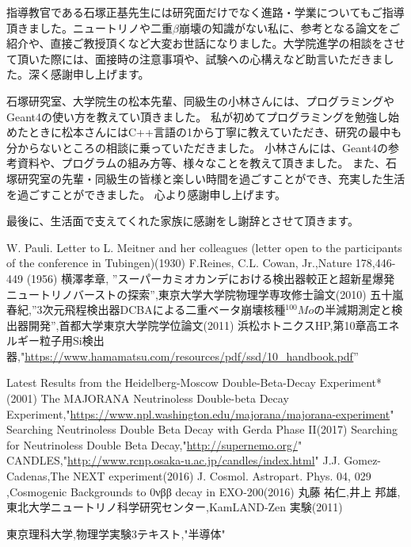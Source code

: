 \documentclass[a4paper,10pt]{jreport}
\begin{document}
指導教官である石塚正基先生には研究面だけでなく進路・学業についてもご指導頂きました。ニュートリノや二重$\beta$崩壊の知識がない私に、参考となる論文をご紹介や、直接ご教授頂くなど大変お世話になりました。大学院進学の相談をさせて頂いた際には、面接時の注意事項や、試験への心構えなど助言いただきました。深く感謝申し上げます。

石塚研究室、大学院生の松本先輩、同級生の小林さんには、プログラミングやGeant4の使い方を教えてい頂きました。
私が初めてプログラミングを勉強し始めたときに松本さんにはC++言語の1から丁寧に教えていただき、研究の最中も分からないところの相談に乗っていただきました。
小林さんには、Geant4の参考資料や、プログラムの組み方等、様々なことを教えて頂きました。
また、石塚研究室の先輩・同級生の皆様と楽しい時間を過ごすことができ、充実した生活を過ごすことができました。
心より感謝申し上げます。

最後に、生活面で支えてくれた家族に感謝をし謝辞とさせて頂きます。




\begin{thebibliography}{9}
 W. Pauli. Letter to L. Meitner and her colleagues (letter open to the participants of the conference in Tubingen)(1930)
 F.Reines, C.L. Cowan, Jr.,Nature 178,446-449 (1956)
 横澤孝章, ''スーパーカミオカンデにおける検出器較正と超新星爆発ニュートリノバーストの探索'',東京大学大学院物理学専攻修士論文(2010)
五十嵐春紀,''3次元飛程検出器DCBAによる二重ベータ崩壊核種$^{100}Mo$の半減期測定と検出器開発'',首都大学東京大学院学位論文(2011)
浜松ホトニクスHP,第10章高エネルギー粒子用Si検出器,"\url{https://www.hamamatsu.com/resources/pdf/ssd/10_handbook.pdf}''

Latest Results from the Heidelberg-Moscow Double-Beta-Decay Experiment*(2001)
The MAJORANA Neutrinoless Double-beta Decay Experiment,"\url{https://www.npl.washington.edu/majorana/majorana-experiment}"
Searching Neutrinoless Double Beta Decay with Gerda Phase II(2017)
Searching for Neutrinoless Double Beta Decay,"\url{http://supernemo.org/}"
CANDLES,"\url{http://www.rcnp.osaka-u.ac.jp/candles/index.html}"
J.J. Gomez-Cadenas,The NEXT experiment(2016)
J. Cosmol. Astropart. Phys. 04, 029 ,Cosmogenic Backgrounds to 0νββ decay in EXO-200(2016)
丸藤 祐仁,井上 邦雄,東北大学ニュートリノ科学研究センター,KamLAND-Zen 実験(2011)

東京理科大学,物理学実験3テキスト,"半導体"
\end{thebibliography}
\end{document}
